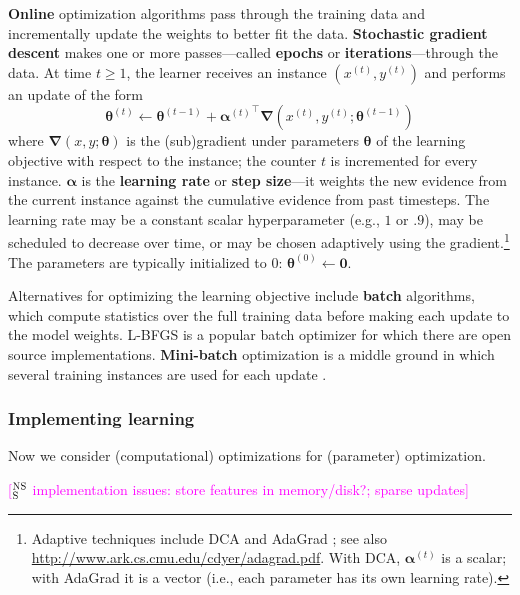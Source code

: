 \documentclass[11pt,letterpaper]{article}
\newcommand{\ensuretext}[1]{#1}
\newcommand{\nssmarker}{\ensuretext{\textcolor{magenta}{\ensuremath{^{\textsc{NS}}_{\textsc{S}}}}}}
\newcommand{\arkcomment}[3]{\ensuretext{\textcolor{#3}{[#1 #2]}}}
\newcommand{\nss}[1]{\arkcomment{\nssmarker}{#1}{magenta}}
\begin{document}
\textbf{Online} optimization algorithms pass through the training data and incrementally update 
the weights to better fit the data.
\textbf{Stochastic gradient descent} \citep[SGD;][]{sgd} makes one or more passes---called \textbf{epochs} or \textbf{iterations}---through the data. 
At time $t \geq 1$, the learner receives an instance $(x^{(t)},y^{(t)})$ and performs an update of the form
\begin{equation}
\boldsymbol{\theta}^{(t)} \leftarrow \boldsymbol{\theta}^{(t-1)} + {\boldsymbol{\alpha}^{(t)}}^{\top} \boldsymbol{\nabla}(x^{(t)},y^{(t)};\boldsymbol{\theta}^{(t-1)})
\end{equation}
where $\boldsymbol{\nabla}(x,y; \boldsymbol{\theta})$ is the (sub)gradient under parameters $\boldsymbol{\theta}$ 
of the learning objective with respect to the instance; the counter $t$ is incremented for every instance.
$\boldsymbol{\alpha}$ is the \textbf{learning rate} or \textbf{step size}---it weights the new evidence 
from the current instance against the cumulative evidence from past timesteps.
The learning rate may be a constant scalar hyperparameter (e.g., $1$ or $.9$), may be scheduled to decrease over time, 
or may be chosen adaptively using the gradient.\footnote{\label{fn:adaptive}Adaptive techniques include DCA \citep{martins-10} 
and AdaGrad \citep{adagrad}; see also \url{http://www.ark.cs.cmu.edu/cdyer/adagrad.pdf}.
With DCA, $\boldsymbol{\alpha}^{(t)}$ is a scalar; with AdaGrad it is a vector (i.e., each parameter has its own learning rate).}
The parameters are typically initialized to 0: $\boldsymbol{\theta}^{(0)} \leftarrow \mathbf{0}$.

Alternatives for optimizing the learning objective include 
\textbf{batch} algorithms, which compute statistics over the full training data 
before making each update to the model weights. 
L-BFGS \citep{lbfgs} is a popular batch optimizer for which there are open source implementations.
\textbf{Mini-batch} optimization is a middle ground in which several training instances 
are used for each update \citep[p.~175]{smith}.

\subsubsection{Implementing learning}

Now we consider (computational) optimizations for (parameter) optimization.

\nss{implementation issues: store features in memory/disk?; sparse updates}
\end{document}
